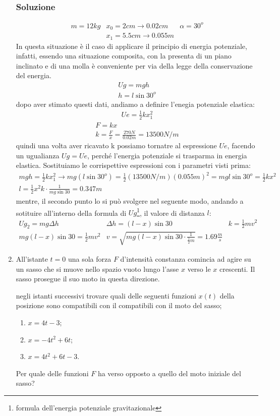 \documentclass{report}
\begin{document}
\begin{enumerate}
\subsubsection{Soluzione}
\label{sec:sol11}
\begin{eqnarray*}
  m=12kg & x_0=2cm\to 0.02cm & \alpha=30^o\\
  & x_1=5.5cm \to 0.055m 
\end{eqnarray*}
In questa situazione è il caso di applicare il principio di energia potenziale,
infatti, essendo una situazione composita, con la presenta di un piano inclinato e
di una molla è conveniente per via della legge della conservazione del energia.
\begin{eqnarray*}
  Ug=mgh\\
  h=l\sin30^o
\end{eqnarray*}
dopo aver stimato questi dati, andiamo a definire l'enegia potenziale elastica:
\begin{eqnarray*}
  Ue=\frac{1}{2}kx_1^2
\end{eqnarray*}
\begin{eqnarray*}
  F=kx\\
  k=\frac{F}{x}=\frac{270N}{0.02m}=13500N/m
\end{eqnarray*}
quindi una volta aver ricavato k possiamo tornatre al espressione $Ue$, facendo un ugualianza $Ug=Ue$, perché l'energia potenziale si trasparma in energia elastica. Sostituiamo le corrispettive espressioni con i parametri visti prima:
\begin{eqnarray*}
  mgh=\frac{1}{2}kx_1^2\to mg(l\sin30^o)=\frac{1}{2}(13500N/m)(0.055m)^2=mgl\sin30^o=\frac{1}{2}kx^2\\
  l=\frac{1}{2}x^2k\cdot \frac{1}{mg\sin 30} =0.347m
\end{eqnarray*}
mentre, il secondo punto lo si può svolgere nel seguente modo, andando a sotituire
all'interno della formula di $Ug$\footnote{formula dell'energia potenziale
  gravitazionale}, il valore di distanza $l$:
\begin{eqnarray*}
  Ug_2=mg\Delta h & \Delta h= (l-x)\sin30 & k=\frac{1}{2}mv^2\\
  mg(l-x)\sin 30 = \frac{1}{2}mv^2 & v=\sqrt{mg(l-x)\sin 30\cdot\frac{1}{\frac{1}{2}m}}=1.69\frac{m}{s}
\end{eqnarray*}
\item All'istante $t=0$ una sola forza $F$ d'intensità constanza
  comincia ad agire su un sasso che si muove nello spazio vuoto lungo
  l'asse $x$ verso le $x$ crescenti. Il sasso prosegue il suo moto in
  questa direzione.
  \begin{tasks}
    \task negli istanti successivi trovare quali delle seguenti funzioni
    $x(t)$ della posizione sono compatibili con il compatibili con il
    moto del sasso;
    \begin{enumerate}
    \item $x=4t-3$;
    \item $x=-4t^2+6t$;
    \item $x=4t^2+6t-3$.
    \end{enumerate}
    \task Per quale delle funzioni $F$ ha verso opposto a quello del moto
    iniziale del sasso?
  \end{tasks}
  

\end{enumerate}
\end{document}
